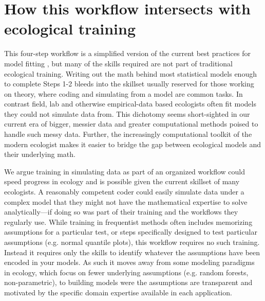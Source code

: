\documentclass[11pt]{article}
\begin{document}
\section*{How this workflow intersects with ecological training} %

This four-step workflow is a simplified version of the current best practices for model fitting  \citep{betanworkflow,vandeschoot2021}, but many of the skills required are not part of traditional ecological training. Writing out the math behind most statistical models enough to complete Steps 1-2 bleeds into the skillset usually reserved for those working on theory, where coding and simulating from a model are common tasks. In contrast field, lab and otherwise empirical-data based ecologists often fit models they could not simulate data from. This dichotomy seems short-sighted in our current era of bigger, messier data and greater computational methods poised to handle such messy data. Further, the increasingly computational toolkit of the modern ecologist makes it easier to bridge the gap between ecological models and their underlying math. 

We argue training in simulating data as part of an organized workflow could speed progress in ecology and is possible given the current skillset of many ecologists. A reasonably competent coder could easily simulate data under a complex model that they might not have the mathematical expertise to solve analytically---if doing so was part of their training and the workflows they regularly use. While training in frequentist methods often includes memorizing assumptions for a particular test, or steps specifically designed to test particular assumptions (e.g. normal quantile plots), this workflow requires no such training. Instead it requires only the skills to identify whatever the assumptions have been encoded in your models. As such it moves away from some modeling paradigms in ecology, which focus on fewer underlying assumptions (e.g. random forests, non-parametric), to building models were the assumptions are transparent and motivated by the specific domain expertise available in each application. %
\end{document}
